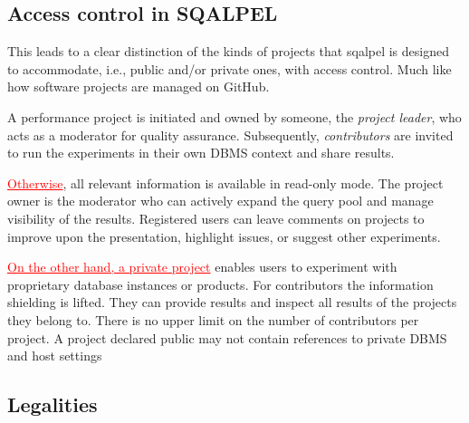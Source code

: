 \documentclass{cidr-2019}
\newcommand{\highlight}[1]{\textcolor{red}{\underline{#1}}}
\begin{document}
\subsection{Access control in SQALPEL}
This leads to a clear distinction of the kinds of projects that {\sc
  sqalpel} is designed to accommodate, i.e., public and/or private
ones, with access control.
Much like how software projects are managed on GitHub. 

A performance project is
initiated and owned by someone, the \emph{project leader}, who acts as
a moderator for quality assurance. Subsequently,
\emph{contributors} are invited to run the experiments in their own DBMS context and share results.

\highlight{Otherwise},
all relevant information is available in
read-only mode. The project owner is the moderator who can actively
expand the query pool and manage visibility of the results. Registered users can
leave comments on projects to improve upon the presentation, highlight
issues, or suggest other experiments.

\highlight{On the other hand, a private project}
enables users to experiment with
proprietary database instances or products. For contributors the
information shielding is lifted. They can provide results and
inspect all results of the projects they belong to. There is no
upper limit on the number of contributors per project.
A project declared public may not contain references to private DBMS
and host settings

\subsection{Legalities\label{legalities}}


\end{document}
